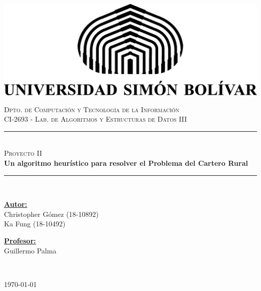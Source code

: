 \documentclass[11pt]{article}
\begin{document}

\begin{center} 
   \newcommand{\HRule}{\rule{\linewidth}{0.5mm}}  

   \begin{minipage}{0.48\textwidth}
      \begin{center}
         \includegraphics[scale = 0.8]{logotip.png}
      \end{center}
   \end{minipage}

   \vspace*{0.2cm}                       
   \textsc{\large Dpto. de Computación y Tecnología de la Información} \\ 
   \textsc{\large CI-2693 - Lab. de Algoritmos y Estructuras de Datos III} \\ [4cm] 

   \vspace*{1cm}                                                                              
   \HRule \\ [0.4cm]     
   \textsc{\Large Proyecto II } \\ [0.4cm]                                       
   {\Huge \bfseries Un algoritmo heurístico para resolver el Problema del Cartero Rural} \\ [0.4cm] 
   \HRule \\ [6cm]

   \begin{minipage}{\textwidth} 
      \begin{flushleft} \large    
         \textbf{\underline{Autor:}} \\ 
         Christopher Gómez (18-10892)\\
         Ka Fung (18-10492)\\
      \end{flushleft}
   \end{minipage}

   \begin{minipage}{\textwidth}    
      \vspace{-2cm}  
      \begin{flushright} \large    
         \textbf{\underline{Profesor:}} \\  
         Guillermo Palma  
      \end{flushright}        
   \end{minipage} \\ [2cm]

   \begin{center} 
      {\large \today} 
   \end{center}     
\end{center}                                                      
\end{document}

